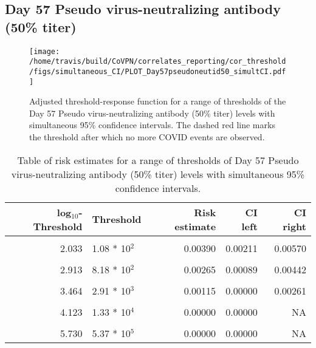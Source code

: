 \documentclass[]{book}
\theoremstyle{definition}
\theoremstyle{definition}
\theoremstyle{definition}
\newcommand{\1}{\mathbbm{1}}
\begin{document}
\newpage

\newpage

\newpage

\hypertarget{day-57-pseudo-virus-neutralizing-antibody-50-titer-2}{%
\subsection{Day 57 Pseudo virus-neutralizing antibody (50\% titer)}\label{day-57-pseudo-virus-neutralizing-antibody-50-titer-2}}

\begin{figure}[H]
\centering
\texttt{[image: /home/travis/build/CoVPN/correlates\_reporting/cor\_threshold/figs/simultaneous\_CI/PLOT\_Day57pseudoneutid50\_simultCI.pdf]}
\caption{Adjusted threshold-response function for a range of thresholds of the
  Day 57 Pseudo virus-neutralizing antibody (50\% titer) levels with simultaneous 95\% confidence intervals. The dashed red line marks the threshold after which no more COVID events are observed. }
\end{figure}
\begin{table}[!h]

\caption{\label{tab:unnamed-chunk-383}Table of risk estimates for a range of thresholds of Day 57 Pseudo virus-neutralizing antibody (50\% titer) levels with simultaneous 95\% confidence intervals.}
\centering
\begin{tabular}[t]{rlrrr}
\toprule
log$_{10}$-Threshold & Threshold & Risk estimate & CI left & CI right\\
\midrule
\cellcolor{gray!6}{0.699} & \cellcolor{gray!6}{5.00 * 10$^0$} & \cellcolor{gray!6}{0.00508} & \cellcolor{gray!6}{0.00314} & \cellcolor{gray!6}{0.00701}\\
2.033 & 1.08 * 10$^2$ & 0.00390 & 0.00211 & 0.00570\\
\cellcolor{gray!6}{2.447} & \cellcolor{gray!6}{2.80 * 10$^2$} & \cellcolor{gray!6}{0.00347} & \cellcolor{gray!6}{0.00165} & \cellcolor{gray!6}{0.00529}\\
2.913 & 8.18 * 10$^2$ & 0.00265 & 0.00089 & 0.00442\\
\cellcolor{gray!6}{3.196} & \cellcolor{gray!6}{1.57 * 10$^3$} & \cellcolor{gray!6}{0.00235} & \cellcolor{gray!6}{0.00055} & \cellcolor{gray!6}{0.00416}\\
3.464 & 2.91 * 10$^3$ & 0.00115 & 0.00000 & 0.00261\\
\cellcolor{gray!6}{3.736} & \cellcolor{gray!6}{5.45 * 10$^3$} & \cellcolor{gray!6}{0.00134} & \cellcolor{gray!6}{0.00000} & \cellcolor{gray!6}{0.00312}\\
4.123 & 1.33 * 10$^4$ & 0.00000 & 0.00000 & NA\\
\cellcolor{gray!6}{4.629} & \cellcolor{gray!6}{4.26 * 10$^4$} & \cellcolor{gray!6}{0.00000} & \cellcolor{gray!6}{0.00000} & \cellcolor{gray!6}{NA}\\
5.730 & 5.37 * 10$^5$ & 0.00000 & 0.00000 & NA\\
\bottomrule
\end{tabular}
\end{table}
\end{document}
